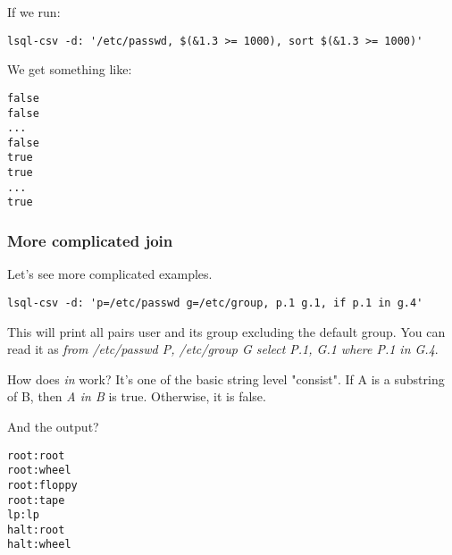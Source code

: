 If we run:
\begin{verbatim}
lsql-csv -d: '/etc/passwd, $(&1.3 >= 1000), sort $(&1.3 >= 1000)'
\end{verbatim}

We get something like:
\begin{verbatim}
false
false
...
false
true
true
...
true
\end{verbatim}

\subsubsection{More complicated join}
Let's see more complicated examples.
\begin{verbatim}
lsql-csv -d: 'p=/etc/passwd g=/etc/group, p.1 g.1, if p.1 in g.4'
\end{verbatim}
This will print all pairs user and its group excluding the default group. You can read it as \textit{from /etc/passwd P, /etc/group G select P.1, G.1 where P.1 in G.4}.

How does \textit{in} work? It's one of the basic string level "consist". If A is a substring of B, then \textit{A in B} is true. Otherwise, it is false.

And the output?
\begin{verbatim}
root:root                                                                                                                                                                                                                                                                 
root:wheel                                                                                                                                                                                                                                                                
root:floppy                                                                                                                                                                                                                                                               
root:tape                                                                                                                                                                                                                                                                 
lp:lp                                                                                                                                                                                                                                                                     
halt:root                                                                                                                                                                                                                                                                 
halt:wheel 
\end{verbatim}

